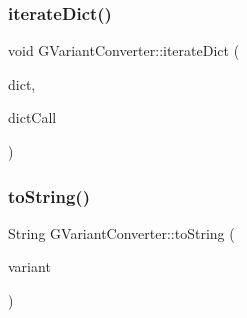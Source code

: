 \mbox{\label{namespaceGVariantConverter_a76ecfa2986842f3557fa749b4aead5e4}} 
\subsubsection{\texorpdfstring{iterate\+Dict()}{iterateDict()}}
{\footnotesize\ttfamily void G\+Variant\+Converter\+::iterate\+Dict (\begin{DoxyParamCaption}\item[{G\+Variant $\ast$}]{dict,  }\item[{std\+::function$<$ void(G\+Variant $\ast$, G\+Variant $\ast$)$>$}]{dict\+Call }\end{DoxyParamCaption})}

\mbox{\label{namespaceGVariantConverter_ae1f44e27a6e117d6ff1b7f1292a059e5}} 
\subsubsection{\texorpdfstring{to\+String()}{toString()}}
{\footnotesize\ttfamily String G\+Variant\+Converter\+::to\+String (\begin{DoxyParamCaption}\item[{G\+Variant $\ast$}]{variant }\end{DoxyParamCaption})}

